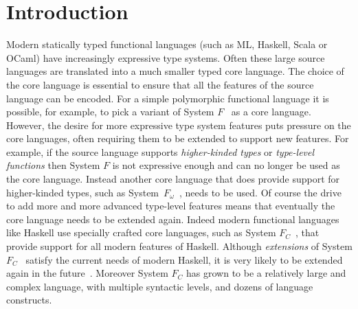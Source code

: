 \section{Introduction}

Modern statically typed functional languages (such as ML, Haskell,
Scala or OCaml) have increasingly expressive type systems. Often these
large source languages are translated into a much smaller typed core
language. The choice of the core language is essential to ensure that
all the features of the source language can be encoded. For a simple
polymorphic functional language it is possible, for example, to pick a
variant of System $F$~\cite{systemfw,Reynolds:1974} as a core
language. However, the desire for more expressive type system features
puts pressure on the core languages, often requiring them to be
extended to support new features.  For example, if the source language
supports \emph{higher-kinded types} or \emph{type-level functions}
then System $F$ is not expressive enough and can no longer be used as
the core language. Instead another core language that does provide
support for higher-kinded types, such as
System~$F_{\omega}$~\cite{systemfw}, needs to be used. Of course the
drive to add more and more advanced type-level features means that
eventually the core language needs to be extended again. Indeed modern
functional languages like Haskell use specially crafted core
languages, such as System $F_{C}$~\cite{fc}, that provide support for all
modern features of Haskell. Although \emph{extensions} of System
$F_{C}$~\cite{fc:pro,Eisenberg:2014} satisfy the current needs of
modern Haskell, it is very likely to be extended again in the
future~\cite{fc:kind}. Moreover System $F_{C}$ has grown to be a relatively
large and complex language, with multiple syntactic levels, and dozens
of language constructs.

\begin{comment}
However System~$F_{\omega}$ is
significantly more complex than System F and thus harder to
maintain. If later a new feature, such as \emph{kind polymorphism}, is
desired the core language may need to be changed again to account for
the new feature, introducing at the same time new sources of
complexity. Indeed the core language for modern versions of 
functional languages are quite complex, having multiple syntactic 
sorts (such as terms, types and kinds), as well as dozens of 
language constructs~\cite{}\bruno{$F_{C}$}. 
\end{comment}

